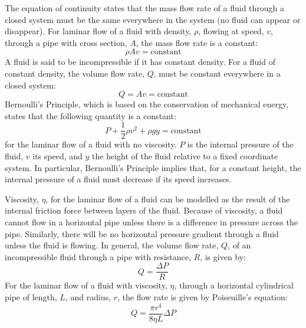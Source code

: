 The equation of continuity states that the mass flow rate of a fluid through a closed system must be the same everywhere in the system (no fluid can appear or disappear). For laminar flow of a fluid with density, $\rho$, flowing at speed, $v$, through a pipe with cross section, $A$, the mass flow rate is a constant:
\begin{equation}
\rho A v= \text{constant}
\end{equation}
A fluid is said to be incompressible if it has constant density. For a fluid of constant density, the volume flow rate, $Q$, must be constant everywhere in a closed system:
\begin{equation}
Q = Av = \text{constant}
\end{equation}
Bernoulli's Principle, which is based on the conservation of mechanical energy, states that the following quantity is a constant:
\begin{equation}
P + \frac{1}{2}\rho v^2 + \rho g y= \text{constant}
\end{equation}
for the laminar flow of a fluid with no viscosity. $P$ is the internal pressure of the fluid, $v$ its speed, and $y$ the height of the fluid relative to a fixed coordinate system. In particular, Bernoulli's Principle implies that, for a constant height, the internal pressure of a fluid must decrease if its speed increases.

Viscosity, $\eta$, for the laminar flow of a fluid can be modelled as the result of the internal friction force between layers of the fluid. Because of viscosity, a fluid cannot flow in a horizontal pipe unless there is a difference in pressure across the pipe. Similarly, there will be no horizontal pressure gradient through a fluid unless the fluid is flowing. In general, the volume flow rate, $Q$, of an incompressible fluid through a pipe with resistance, $R$, is given by:
\begin{equation}
Q = \frac{\Delta P}{R}
\end{equation}
For the laminar flow of a fluid with viscosity, $\eta$, through a horizontal cylindrical pipe of length, $L$, and radius, $r$, the flow rate is given by Poiseuille's equation:
\begin{equation}
Q =  \frac{\pi r^4}{8\eta L}\Delta P
\end{equation}

